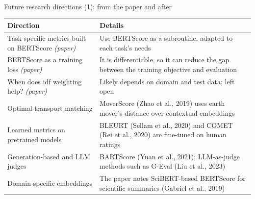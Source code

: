 \documentclass[aspectratio=169,11pt]{beamer}
\begin{document}
\begin{frame}{Future research directions (1): from the paper and after}
  \small
  \begin{tabularx}{\textwidth}{@{}lX@{}}
    \toprule
    Direction & Details\\
    \midrule
    Task-specific metrics built on BERTScore \emph{(paper)} & Use BERTScore as a subroutine, adapted to each task's needs\\
    BERTScore as a training loss \emph{(paper)} & It is differentiable, so it can reduce the gap between the training objective and evaluation\\
    When does idf weighting help? \emph{(paper)} & Likely depends on domain and test data; left open\\
    Optimal-transport matching & MoverScore (Zhao et al., 2019) uses earth mover's distance over contextual embeddings\\
    Learned metrics on pretrained models & BLEURT (Sellam et al., 2020) and COMET (Rei et al., 2020) are fine-tuned on human ratings\\
    Generation-based and LLM judges & BARTScore (Yuan et al., 2021); LLM-as-judge methods such as G-Eval (Liu et al., 2023)\\
    Domain-specific embeddings & The paper notes SciBERT-based BERTScore for scientific summaries (Gabriel et al., 2019)\\
    \bottomrule
  \end{tabularx}
\end{frame}
\end{document}
